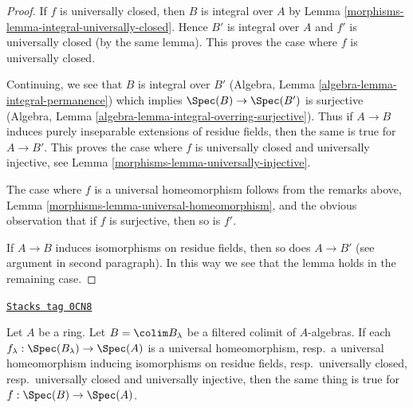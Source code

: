 \begin{proof}

If $f$ is universally closed, then
$B$ is integral over $A$ by Lemma \ref{morphisms-lemma-integral-universally-closed}.
Hence $B'$ is integral over $A$ and $f'$
is universally closed (by the same lemma).
This proves the case where $f$ is universally closed.

\medskip\noindent
Continuing, we see that $B$ is integral over $B'$
(Algebra, Lemma \ref{algebra-lemma-integral-permanence})
which implies $\Spec(B) \to \Spec(B')$ is surjective
(Algebra, Lemma \ref{algebra-lemma-integral-overring-surjective}).
Thus if $A \to B$ induces purely inseparable extensions of residue fields,
then the same is true for $A \to B'$. This proves the case
where $f$ is universally closed and universally injective, see
Lemma \ref{morphisms-lemma-universally-injective}.

\medskip\noindent
The case where $f$ is a universal homeomorphism follows from
the remarks above, Lemma \ref{morphisms-lemma-universal-homeomorphism},
and the obvious observation that if $f$ is surjective, then so is $f'$.

\medskip\noindent
If $A \to B$ induces isomorphisms on residue fields, then
so does $A \to B'$ (see argument in second paragraph).
In this way we see that the lemma holds in the remaining case.
\end{proof}

\begin{lemma}
\label{morphisms-lemma-colimit-inherits}
\href{https://stacks.math.columbia.edu/tag/0CN8}{\texttt{Stacks tag 0CN8}}

Let $A$ be a ring. Let $B = \colim B_\lambda$ be a filtered colimit
of $A$-algebras. If each $f_\lambda : \Spec(B_\lambda) \to \Spec(A)$
is a universal homeomorphism,
resp.\ a universal homeomorphism inducing isomorphisms on residue fields,
resp.\ universally closed,
resp.\ universally closed and universally injective,
then the same thing is true for $f : \Spec(B) \to \Spec(A)$.
\end{lemma}

